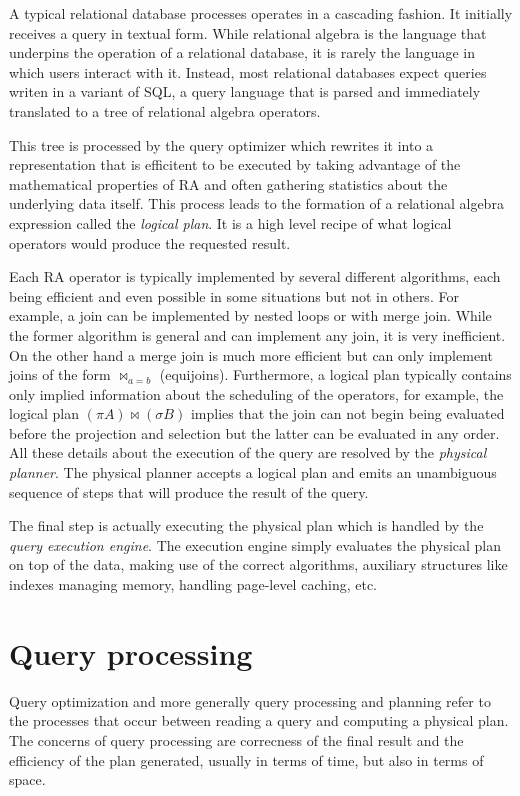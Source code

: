 A typical relational database processes operates in a cascading
fashion. It initially receives a query in textual form. While
relational algebra is the language that underpins the operation of a
relational database, it is rarely the language in which users interact
with it. Instead, most relational databases expect queries writen in a
variant of SQL, a query language that is parsed and immediately
translated to a tree of relational algebra operators.

This tree is processed by the query optimizer which rewrites it into a
representation that is efficitent to be executed by taking advantage
of the mathematical properties of RA and often gathering statistics
about the underlying data itself. This process leads to the formation
of a relational algebra expression called the \emph{logical plan}. It is a
high level recipe of what logical operators would produce the
requested result.


Each RA operator is typically implemented by several different
algorithms, each being efficient and even possible in some situations
but not in others. For example, a join can be implemented by nested
loops or with merge join.  While the former algorithm is general and
can implement any join, it is very inefficient. On the other hand a
merge join is much more efficient but can only implement joins of the
form \(\Join_{a=b}\) (equijoins). Furthermore, a logical plan typically
contains only implied information about the scheduling of the
operators, for example, the logical plan \((\pi A) \Join (\sigma B)\)
implies that the join can not begin being evaluated before the
projection and selection but the latter can be evaluated in any
order. All these details about the execution of the query are resolved
by the \emph{physical planner}. The physical planner accepts a logical
plan and emits an unambiguous sequence of steps that will produce the
result of the query.

The final step is actually executing the physical plan which is
handled by the \emph{query execution engine}. The execution engine simply
evaluates the physical plan on top of the data, making use of the
correct algorithms, auxiliary structures like indexes managing memory,
handling page-level caching, etc.

\section{Query processing}
\label{sec:org1ddf14b}

Query optimization and more generally query processing and planning
refer to the processes that occur between reading a query and
computing a physical plan. The concerns of query processing are
correcness of the final result and the efficiency of the plan
generated, usually in terms of time, but also in terms of space.


